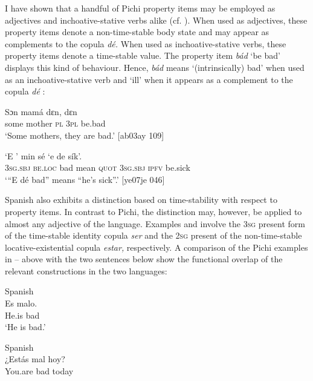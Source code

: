 I have shown that a handful of Pichi property items may be employed as adjectives and inchoative-stative verbs alike (cf. ). When used as adjectives, these property items denote a non-time-stable body state and may appear as complements to the copula \textit{dé.} When used as inchoative-stative verbs, these property items denote a time-stable value. The property item \textit{bád} ‘be bad’ displays this kind of behaviour. Hence, \textit{bád} means ‘(intrinsically) bad’  when used as an inchoative-stative verb and ‘ill’ when it appears as a complement to the copula \textit{dé} : 


\ea%
    \label{ex:key:1718}
    \gll Sɔn    mamá  dɛn,    dɛn  \\
some  mother  \textsc{pl}    \textsc{3pl}  be.bad\\

\glt ‘Some mothers, they are bad.’ [ab03ay 109]
\z


\ea%
    \label{ex:key:1719}
    \gll ‘E        ’    min    sé    ‘e    de  sík’.\\
\textsc{3sg.sbj}  \textsc{be.loc}  bad    mean  \textsc{quot}    \textsc{3sg.sbj}  \textsc{ipfv}  be.sick\\

\glt ‘“E dé bad” means “he’s sick”.’ [ye07je 046]
\z

Spanish also exhibits a distinction based on time-stability with respect to property items. In contrast to Pichi, the distinction may, however, be applied to almost any adjective of the language. Examples  and  involve the \textsc{3sg} present form of the time-stable identity copula \textit{ser} and the \textsc{2sg} present of the non-time-stable locative-existential copula \textit{estar,} respectively. A comparison of the Pichi examples in – above with the two sentences below show the functional overlap of the relevant constructions in the two languages: 


\ea%
    \label{ex:key:1720}
{{Spanish}}{}{}\\
    \gll Es    malo.                            \\
He.is  bad\\

\glt ‘He is bad.’
\z


\ea%
    \label{ex:key:1721}
{{Spanish}}{}{}\\
    \gll ¿Estás  mal  hoy?                          \\
You.are  bad  today\\

